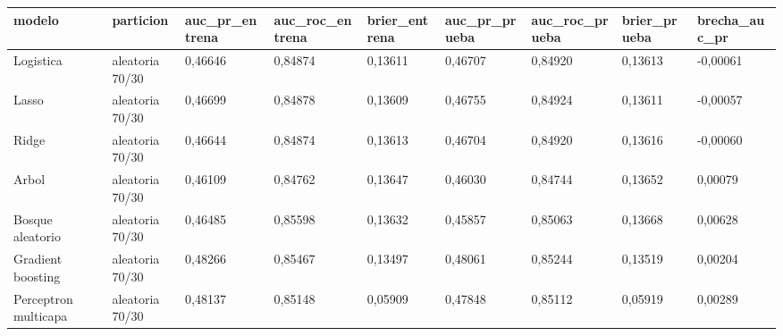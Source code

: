 \begin{tabular}{lllllllll}
\toprule
modelo & particion & auc\_pr\_entrena & auc\_roc\_entrena & brier\_entrena & auc\_pr\_prueba & auc\_roc\_prueba & brier\_prueba & brecha\_auc\_pr \\
\midrule
Logistica & aleatoria 70/30 & 0{,}46646 & 0{,}84874 & 0{,}13611 & 0{,}46707 & 0{,}84920 & 0{,}13613 & -0{,}00061 \\
Lasso & aleatoria 70/30 & 0{,}46699 & 0{,}84878 & 0{,}13609 & 0{,}46755 & 0{,}84924 & 0{,}13611 & -0{,}00057 \\
Ridge & aleatoria 70/30 & 0{,}46644 & 0{,}84874 & 0{,}13613 & 0{,}46704 & 0{,}84920 & 0{,}13616 & -0{,}00060 \\
Arbol & aleatoria 70/30 & 0{,}46109 & 0{,}84762 & 0{,}13647 & 0{,}46030 & 0{,}84744 & 0{,}13652 & 0{,}00079 \\
Bosque aleatorio & aleatoria 70/30 & 0{,}46485 & 0{,}85598 & 0{,}13632 & 0{,}45857 & 0{,}85063 & 0{,}13668 & 0{,}00628 \\
Gradient boosting & aleatoria 70/30 & 0{,}48266 & 0{,}85467 & 0{,}13497 & 0{,}48061 & 0{,}85244 & 0{,}13519 & 0{,}00204 \\
Perceptron multicapa & aleatoria 70/30 & 0{,}48137 & 0{,}85148 & 0{,}05909 & 0{,}47848 & 0{,}85112 & 0{,}05919 & 0{,}00289 \\
\bottomrule
\end{tabular}
